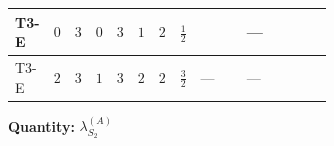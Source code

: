 \documentclass[8pt]{article}
\begin{document}
\begin{landscape}
\begin{longtable}{@{}llcccccc >{\raggedright\arraybackslash}p{0.21\linewidth} >{\raggedright\arraybackslash}p{0.21\linewidth} >{\raggedright\arraybackslash}p{0.21\linewidth}@{}}
\midrule
T3-E & $0$ & $3$ & $0$ & $3$ & $1$ & $2$ & $\frac{1}{2}$ & \scriptsize\adjustbox{max width=\linewidth}{$\begin{gathered} +\frac{3 {g_1}^4}{2}\end{gathered}$} & --- & \scriptsize\adjustbox{max width=\linewidth}{$\begin{gathered} +\frac{{\lambda_{HS_2}^{(1)}}^2}{2}\end{gathered}$} \\
\midrule
T3-E & $2$ & $3$ & $1$ & $3$ & $2$ & $2$ & $\frac{3}{2}$ & --- & --- & \scriptsize\adjustbox{max width=\linewidth}{$\begin{gathered} +\frac{{\lambda_{HS_2}^{(1)}}^2}{2}\end{gathered}$} \\
\midrule
\bottomrule
\end{longtable}
\clearpage
\noindent\textbf{Quantity: }$\lambda_{S_2}^{(A)}$\par\smallskip

\end{landscape}
\end{document}
